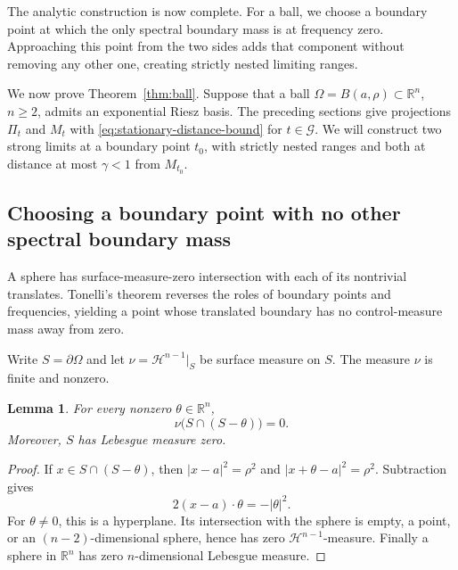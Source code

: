 \documentclass[a4paper,12pt,reqno]{amsart}
\newcommand{\lead}[1]{\par\smallskip\noindent\leavevmode#1\par\smallskip}
\newtheorem{lemma}[theorem]{Lemma}
\theoremstyle{remark}
\numberwithin{equation}{section}
\newcommand{\R}{\mathbb R}
\begin{document}
\lead{The analytic construction is now complete. For a ball, we choose a
boundary point at which the only spectral boundary mass is at frequency
zero. Approaching this point from the two sides adds that component
without removing any other one, creating strictly nested limiting ranges.}


We now prove Theorem~\ref{thm:ball}. Suppose that a ball
$\Omega=B(a,\rho)\subset\R^n$, $n\geq2$, admits an exponential Riesz
basis. The preceding sections give projections $\Pi_t$ and $M_t$ with
\eqref{eq:stationary-distance-bound} for $t\in\mathcal G$. We will
construct two strong limits at a boundary point $t_0$, with strictly
nested ranges and both at distance at most $\gamma<1$ from $M_{t_0}$.

\subsection{Choosing a boundary point with no other spectral boundary mass}


\lead{A sphere has surface-measure-zero intersection with each of its
nontrivial translates. Tonelli's theorem reverses the roles of boundary
points and frequencies, yielding a point whose translated boundary has
no control-measure mass away from zero.}


Write $S=\partial\Omega$ and let $\nu=\mathcal H^{n-1}|_S$ be surface
measure on $S$. The measure $\nu$ is finite and nonzero.

\begin{lemma}\label{lem:sphere}
For every nonzero $\theta\in\R^n$,
\begin{equation}\label{eq:sphere-intersection}
 \nu\bigl(S\cap(S-\theta)\bigr)=0.
\end{equation}
Moreover, $S$ has Lebesgue measure zero.
\end{lemma}

\begin{proof}
If $x\in S\cap(S-\theta)$, then $|x-a|^2=\rho^2$ and
$|x+\theta-a|^2=\rho^2$. Subtraction gives
\[
 2(x-a)\cdot\theta=-|\theta|^2.
\]
For $\theta\ne0$, this is a hyperplane. Its intersection with the sphere
is empty, a point, or an $(n-2)$-dimensional sphere, hence has zero
$\mathcal H^{n-1}$-measure. Finally a sphere in $\R^n$ has zero
$n$-dimensional Lebesgue measure.
\end{proof}
\end{document}
